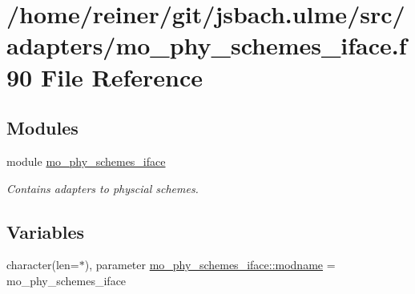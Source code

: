\hypertarget{mo__phy__schemes__iface_8f90}{}\section{/home/reiner/git/jsbach.ulme/src/adapters/mo\+\_\+phy\+\_\+schemes\+\_\+iface.f90 File Reference}
\label{mo__phy__schemes__iface_8f90}
\subsection*{Modules}
\begin{DoxyCompactItemize}
\item 
module \hyperlink{namespacemo__phy__schemes__iface}{mo\+\_\+phy\+\_\+schemes\+\_\+iface}
\begin{DoxyCompactList}\small\item\em Contains adapters to physcial schemes. \end{DoxyCompactList}\end{DoxyCompactItemize}
\subsection*{Variables}
\begin{DoxyCompactItemize}
\item 
character(len=$\ast$), parameter \hyperlink{namespacemo__phy__schemes__iface_ad26c92d4f0618c6e9598f1e1871f08fa}{mo\+\_\+phy\+\_\+schemes\+\_\+iface\+::modname} = \textquotesingle{}mo\+\_\+phy\+\_\+schemes\+\_\+iface\textquotesingle{}
\end{DoxyCompactItemize}
